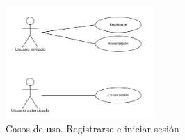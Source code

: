 \begin{figure}[H]
    \centering
    \includegraphics[width=0.5\textwidth]{figures/6-Analisis/6-Casos-uso/6_3_1_Registro-inicio-sesion.png}
    \caption{Casos de uso. Registrarse e iniciar sesión}
    \label{fig:cu_registro-inicio-sesion}
\end{figure}


